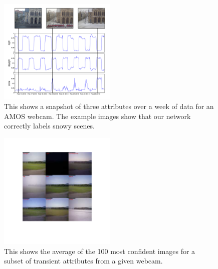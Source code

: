 \documentclass[10pt,twocolumn,letterpaper]{article}
\begin{document}

\begin{figure}[t]
	\centering
		\includegraphics[width=0.5\textwidth, trim= 5mm 15mm 0mm 10mm]{figs/attr_compare.pdf}
		\caption{This shows a snapshot of three attributes over a week of data for
             an AMOS webcam.  The example images show that our network 
             correctly labels snowy scenes.}
		\label{fig:attrcmp}
\end{figure}

\begin{figure}[t]
	\centering
		\includegraphics[width=0.5\textwidth, trim= 35mm 50mm 30mm 31mm]{figs/montage_pruned_cam_7211.pdf}
		\caption{This shows the average of the 100 most confident images for
             a subset of transient attributes from a given webcam.} 
		\label{fig:netvis}
\end{figure}
\end{document}
